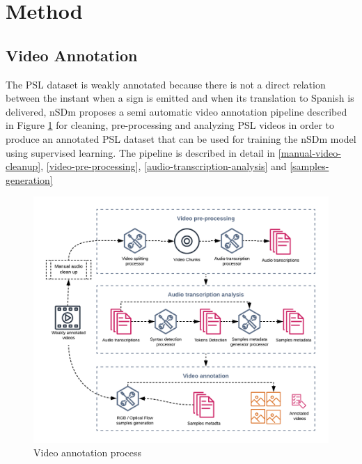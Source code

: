\documentclass[twocolumn,conference]{article}
\begin{document}
\section{Method}\label{method}
\subsection{Video Annotation}\label{videoannot}
The PSL dataset is weakly annotated because there is not a direct relation between the instant when a sign is emitted and when its translation to Spanish is delivered, nSDm proposes a semi automatic video annotation pipeline described in Figure \ref{fig:video-annotation-pipeline} for cleaning, pre-processing and analyzing PSL videos in order to produce an annotated PSL dataset that can be used for training the nSDm model using supervised learning. The pipeline is described in detail in \ref{manual-video-cleanup}, \ref{video-pre-processing}, \ref{audio-transcription-analysis} and \ref{samples-generation}

\begin{figure}[hbt!]
\includegraphics[width=\linewidth]{images/video-annotation-pipeline.png}
\caption{Video annotation process}
\label{fig:video-annotation-pipeline}
\end{figure}
\end{document}
